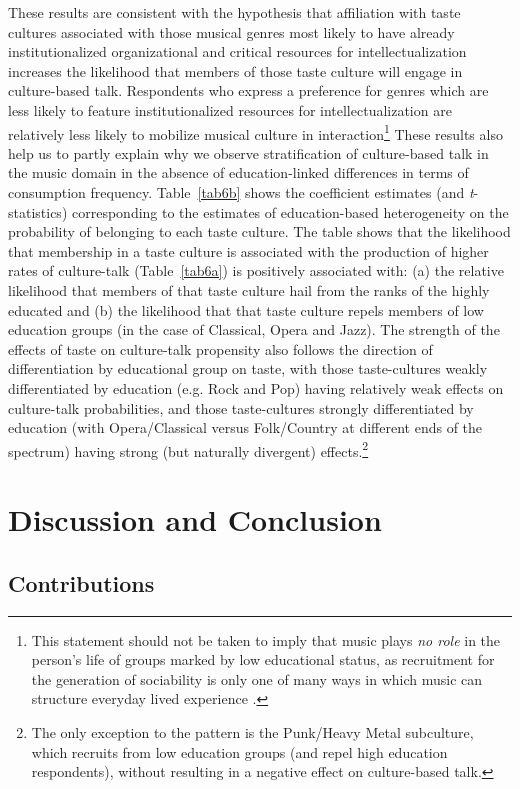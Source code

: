 \documentclass[11pt]{article}
\begin{document}
These results are consistent with the hypothesis that affiliation with taste cultures associated with those musical genres most likely to have already institutionalized organizational and critical resources for intellectualization increases the likelihood that members of those taste culture will engage in culture-based talk. Respondents who express a preference for genres which are less likely to feature institutionalized resources for intellectualization are relatively less likely to mobilize musical culture in interaction\footnote{This statement should not be taken to imply that music plays \emph{no role} in the person's life of groups marked by low educational status, as recruitment for the generation of sociability is only one of many ways in which music can structure everyday lived experience \citep{denora00}.}   These results also help us to partly explain why we observe stratification of culture-based talk in the music domain in the absence of education-linked differences in terms of consumption frequency.  Table~\ref{tab6b} shows the coefficient estimates (and \emph{t}-statistics) corresponding to the estimates of education-based heterogeneity on the probability of belonging to each taste culture.  The table shows that the likelihood that membership in a taste culture is associated with the production of higher rates of culture-talk (Table~\ref{tab6a}) is positively associated with: (a) the relative likelihood that members of that taste culture hail from the ranks of the highly educated and (b) the likelihood that that taste culture repels members of low education groups (in the case of Classical, Opera and Jazz).   The strength of the effects of taste on culture-talk propensity also follows the direction of differentiation by educational group on taste, with those taste-cultures weakly differentiated by education (e.g. Rock and Pop) having relatively weak effects on culture-talk probabilities, and those taste-cultures strongly differentiated by education (with Opera/Classical versus Folk/Country at different ends of the spectrum) having strong (but naturally divergent) effects.\footnote{The only exception to the pattern is the Punk/Heavy Metal subculture, which recruits from low education groups (and repel high education respondents), without resulting in a negative effect on culture-based talk.}

\section{Discussion and Conclusion}
\subsection{Contributions}
\end{document}
